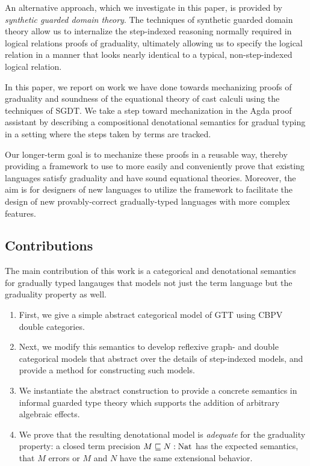 An alternative approach, which we investigate in this paper, is provided by
\emph{synthetic guarded domain theory}\cite{birkedal-mogelberg-schwinghammer-stovring2011}.
The techniques of synthetic guarded domain theory allow us to internalize the
step-indexed reasoning normally required in logical relations proofs of graduality,
ultimately allowing us to specify the logical relation in a manner that looks nearly
identical to a typical, non-step-indexed logical relation.

In this paper, we report on work we have done towards mechanizing proofs of graduality
and soundness of the equational theory of cast calculi using the techniques of SGDT.
We take a step toward mechanization in the Agda proof assistant by describing a compositional
denotational semantics for gradual typing in a setting where the steps taken by terms are tracked.

Our longer-term goal is to mechanize these proofs in a reusable way, thereby providing a framework
to use to more easily and conveniently prove that existing languages satisfy graduality and have
sound equational theories. Moreover, the aim is for designers of new languages to utilize the
framework to facilitate the design of new provably-correct gradually-typed languages with more
complex features.

\subsection{Contributions}

The main contribution of this work is a categorical and denotational
semantics for gradually typed langauges that models not just the term
language but the graduality property as well.
\begin{enumerate}
\item First, we give a simple abstract categorical model of GTT using CBPV double categories.
\item Next, we modify this semantics to develop reflexive graph- and
  double categorical models that abstract over the details of
  step-indexed models, and provide a method for constructing such models.
\item We instantiate the abstract construction to provide a concrete
  semantics in informal guarded type theory which supports the
  addition of arbitrary algebraic effects.
\item We prove that the resulting denotational model is
  \emph{adequate} for the graduality property: a closed term precision
  $M \sqsubseteq N : \text{Nat}$ has the expected semantics, that $M$ errors or
  $M$ and $N$ have the same extensional behavior.
\end{enumerate}

